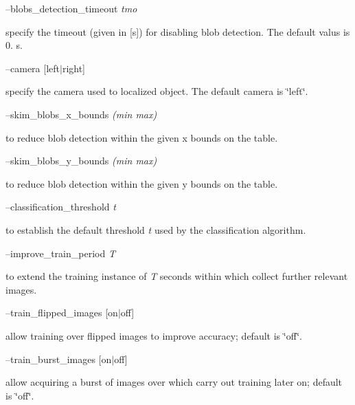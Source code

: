 --blobs\+\_\+detection\+\_\+timeout {\itshape tmo} 
\begin{DoxyItemize}
\item specify the timeout (given in \mbox{[}s\mbox{]}) for disabling blob detection. The default valus is 0. s.
\end{DoxyItemize}

--camera {\itshape }\mbox{[}left$\vert$right\mbox{]}
\begin{DoxyItemize}
\item specify the camera used to localized object. The default camera is \char`\"{}left\char`\"{}.
\end{DoxyItemize}

--skim\+\_\+blobs\+\_\+x\+\_\+bounds {\itshape (min max)}
\begin{DoxyItemize}
\item to reduce blob detection within the given x bounds on the table.
\end{DoxyItemize}

--skim\+\_\+blobs\+\_\+y\+\_\+bounds {\itshape (min max)}
\begin{DoxyItemize}
\item to reduce blob detection within the given y bounds on the table.
\end{DoxyItemize}

--classification\+\_\+threshold {\itshape t} 
\begin{DoxyItemize}
\item to establish the default threshold {\itshape t} used by the classification algorithm.
\end{DoxyItemize}

--improve\+\_\+train\+\_\+period {\itshape T} 
\begin{DoxyItemize}
\item to extend the training instance of {\itshape T} seconds within which collect further relevant images.
\end{DoxyItemize}

--train\+\_\+flipped\+\_\+images {\itshape }\mbox{[}on$\vert$off\mbox{]}
\begin{DoxyItemize}
\item allow training over flipped images to improve accuracy; default is \char`\"{}off\char`\"{}.
\end{DoxyItemize}

--train\+\_\+burst\+\_\+images {\itshape }\mbox{[}on$\vert$off\mbox{]}
\begin{DoxyItemize}
\item allow acquiring a burst of images over which carry out training later on; default is \char`\"{}off\char`\"{}.
\end{DoxyItemize}

